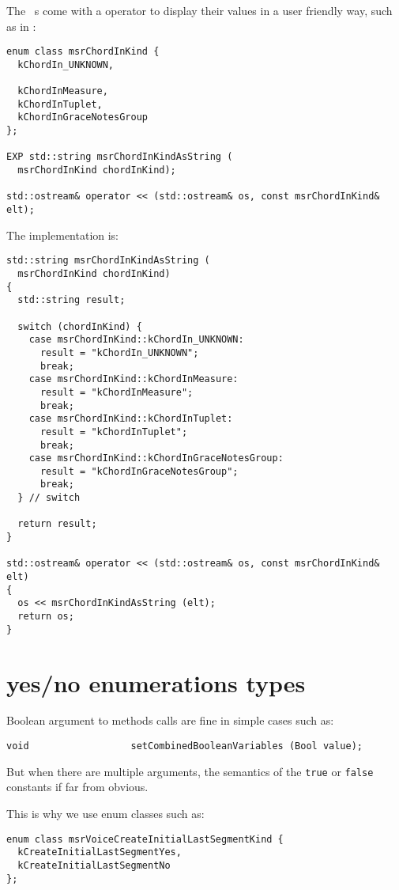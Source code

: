 The \mf\ \enumType s come with a \code{$<$$<$} operator to display their values in a user friendly way, such as  in :
\begin{lstlisting}[language=CPlusPlus]
enum class msrChordInKind {
  kChordIn_UNKNOWN,

  kChordInMeasure,
  kChordInTuplet,
  kChordInGraceNotesGroup
};

EXP std::string msrChordInKindAsString (
  msrChordInKind chordInKind);

std::ostream& operator << (std::ostream& os, const msrChordInKind& elt);
\end{lstlisting}

The implementation is:
\begin{lstlisting}[language=CPlusPlus]
std::string msrChordInKindAsString (
  msrChordInKind chordInKind)
{
  std::string result;

  switch (chordInKind) {
    case msrChordInKind::kChordIn_UNKNOWN:
      result = "kChordIn_UNKNOWN";
      break;
    case msrChordInKind::kChordInMeasure:
      result = "kChordInMeasure";
      break;
    case msrChordInKind::kChordInTuplet:
      result = "kChordInTuplet";
      break;
    case msrChordInKind::kChordInGraceNotesGroup:
      result = "kChordInGraceNotesGroup";
      break;
  } // switch

  return result;
}

std::ostream& operator << (std::ostream& os, const msrChordInKind& elt)
{
  os << msrChordInKindAsString (elt);
  return os;
}
\end{lstlisting}


\section{yes/no enumerations types}

Boolean argument to methods calls are fine in simple cases such as:
\begin{lstlisting}[language=CPlusPlus]
    void                  setCombinedBooleanVariables (Bool value);
\end{lstlisting}

But when there are multiple arguments, the semantics of the {\tt true} or {\tt false} constants if far from obvious.

This is why we use enum classes such as:
\begin{lstlisting}[language=CPlusPlus]
enum class msrVoiceCreateInitialLastSegmentKind {
  kCreateInitialLastSegmentYes,
  kCreateInitialLastSegmentNo
};
\end{lstlisting}

